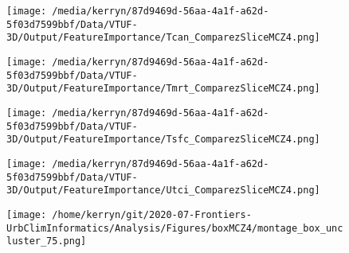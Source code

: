 \documentclass{article}
\begin{document}
%
%
\begin{figure}
\centering    
\texttt{[image: /media/kerryn/87d9469d-56aa-4a1f-a62d-5f03d7599bbf/Data/VTUF-3D/Output/FeatureImportance/Tcan\_ComparezSliceMCZ4.png]}
\end{figure} 
\clearpage


\begin{figure}
\centering    
\texttt{[image: /media/kerryn/87d9469d-56aa-4a1f-a62d-5f03d7599bbf/Data/VTUF-3D/Output/FeatureImportance/Tmrt\_ComparezSliceMCZ4.png]}
\end{figure} 
\clearpage


\begin{figure}
\centering    
\texttt{[image: /media/kerryn/87d9469d-56aa-4a1f-a62d-5f03d7599bbf/Data/VTUF-3D/Output/FeatureImportance/Tsfc\_ComparezSliceMCZ4.png]}
\end{figure} 
\clearpage

\begin{figure}
\centering    
\texttt{[image: /media/kerryn/87d9469d-56aa-4a1f-a62d-5f03d7599bbf/Data/VTUF-3D/Output/FeatureImportance/Utci\_ComparezSliceMCZ4.png]}
\end{figure} 
\clearpage









\begin{figure}
\centering    
\texttt{[image: /home/kerryn/git/2020-07-Frontiers-UrbClimInformatics/Analysis/Figures/boxMCZ4/montage\_box\_uncluster\_75.png]}
\end{figure} 
\clearpage
\end{document}
